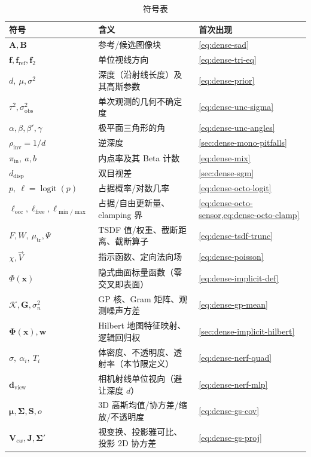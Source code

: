 \begin{table}[H]\centering\small
\caption{符号表}
\begin{tabular}{lll}
\toprule
符号 & 含义 & 首次出现 \\
\midrule
$\mathbf{A},\mathbf{B}$ & 参考/候选图像块 & \cref{eq:dense-sad} \\
$\mathbf{f},\mathbf{f}_{\mathrm{ref}},\mathbf{f}_2$ & 单位视线方向 & \cref{eq:dense-tri-eq} \\
$d,\ \mu,\sigma^2$ & 深度（沿射线长度）及其高斯参数 & \cref{eq:dense-prior} \\
$\tau^2,\sigma_{\mathrm{obs}}^2$ & 单次观测的几何不确定度 & \cref{eq:dense-unc-sigma} \\
$\alpha,\beta,\beta',\gamma$ & 极平面三角形的角 & \cref{eq:dense-unc-angles} \\
$\rho_{\mathrm{inv}}=1/d$ & 逆深度 & \cref{sec:dense-mono-pitfalls} \\
$\pi_{\mathrm{in}},\ a,b$ & 内点率及其 Beta 计数 & \cref{eq:dense-mix} \\
$d_{\mathrm{disp}}$ & 双目视差 & \cref{sec:dense-sgm} \\
$p,\ \ell=\operatorname{logit}(p)$ & 占据概率/对数几率 & \cref{eq:dense-octo-logit} \\
$\ell_{\mathrm{occ}},\ell_{\mathrm{free}},\ell_{\min/\max}$ & 占据/自由更新量、clamping 界 & \cref{eq:dense-octo-sensor,eq:dense-octo-clamp} \\
$F,W,\ \mu_{\mathrm{tr}},\Psi$ & TSDF 值/权重、截断距离、截断算子 & \cref{eq:dense-tsdf-trunc} \\
$\chi,\vec{V}$ & 指示函数、定向法向场 & \cref{eq:dense-poisson} \\
$\Phi(\mathbf{x})$ & 隐式曲面标量函数（零交叉即表面） & \cref{eq:dense-implicit-def} \\
$\mathcal{K},\mathbf{G},\sigma_n^2$ & GP 核、Gram 矩阵、观测噪声方差 & \cref{eq:dense-gp-mean} \\
$\boldsymbol{\Phi}(\mathbf{x}),\mathbf{w}$ & Hilbert 地图特征映射、逻辑回归权 & \cref{sec:dense-implicit-hilbert} \\
$\sigma,\ \alpha_i,\ T_i$ & 体密度、不透明度、透射率（本节限定义） & \cref{eq:dense-nerf-quad} \\
$\mathbf{d}_{\mathrm{view}}$ & 相机射线单位视向（避让深度 $d$） & \cref{eq:dense-nerf-mlp} \\
$\boldsymbol{\mu},\boldsymbol{\Sigma},\mathbf{S},o$ & 3D 高斯均值/协方差/缩放/不透明度 & \cref{eq:dense-gs-cov} \\
$\mathbf{V}_{cw},\mathbf{J},\boldsymbol{\Sigma}'$ & 视变换、投影雅可比、投影 2D 协方差 & \cref{eq:dense-gs-proj} \\
\bottomrule
\end{tabular}
\end{table}

